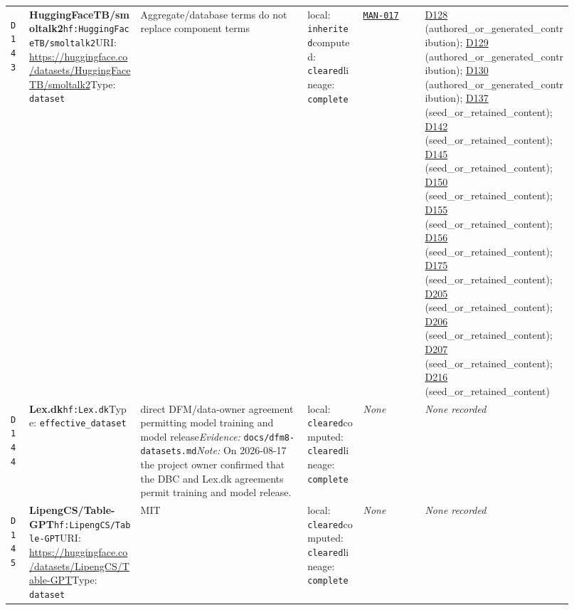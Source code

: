 \documentclass[9pt,a4paper]{article}
\newcommand{\depid}[1]{\hypertarget{dep:#1}{\texttt{#1}}}
\begin{document}
\begin{landscape}
\begin{longtable}{@{}L{0.035\linewidth}L{0.185\linewidth}L{0.27\linewidth}L{0.09\linewidth}L{0.10\linewidth}L{0.24\linewidth}@{}}
\depid{D143} & \textbf{HuggingFaceTB/smoltalk2}\newline \nolinkurl{hf:HuggingFaceTB/smoltalk2}\newline URI: \url{https://huggingface.co/datasets/HuggingFaceTB/smoltalk2}\newline Type: \texttt{dataset} & Aggregate/database terms do not replace component terms & local: \texttt{inherited}\newline computed: \texttt{cleared}\newline lineage: \texttt{complete} & \hyperlink{manual:MAN-017}{\texttt{MAN-017}} & \hyperlink{dep:D128}{D128} (authored\_or\_generated\_contribution); \hyperlink{dep:D129}{D129} (authored\_or\_generated\_contribution); \hyperlink{dep:D130}{D130} (authored\_or\_generated\_contribution); \hyperlink{dep:D137}{D137} (seed\_or\_retained\_content); \hyperlink{dep:D142}{D142} (seed\_or\_retained\_content); \hyperlink{dep:D145}{D145} (seed\_or\_retained\_content); \hyperlink{dep:D150}{D150} (seed\_or\_retained\_content); \hyperlink{dep:D155}{D155} (seed\_or\_retained\_content); \hyperlink{dep:D156}{D156} (seed\_or\_retained\_content); \hyperlink{dep:D175}{D175} (seed\_or\_retained\_content); \hyperlink{dep:D205}{D205} (seed\_or\_retained\_content); \hyperlink{dep:D206}{D206} (seed\_or\_retained\_content); \hyperlink{dep:D207}{D207} (seed\_or\_retained\_content); \hyperlink{dep:D216}{D216} (seed\_or\_retained\_content) \\
\depid{D144} & \textbf{Lex.dk}\newline \nolinkurl{hf:Lex.dk}\newline Type: \texttt{effective\_dataset} & direct DFM/data-owner agreement permitting model training and model release\newline \textit{Evidence:} \nolinkurl{docs/dfm8-datasets.md}\newline \textit{Note:} On 2026-08-17 the project owner confirmed that the DBC and Lex.dk agreements permit training and model release. & local: \texttt{cleared}\newline computed: \texttt{cleared}\newline lineage: \texttt{complete} & \textit{None} & \textit{None recorded} \\
\depid{D145} & \textbf{LipengCS/Table-GPT}\newline \nolinkurl{hf:LipengCS/Table-GPT}\newline URI: \url{https://huggingface.co/datasets/LipengCS/Table-GPT}\newline Type: \texttt{dataset} & MIT & local: \texttt{cleared}\newline computed: \texttt{cleared}\newline lineage: \texttt{complete} & \textit{None} & \textit{None recorded} \\

\end{longtable}
\end{landscape}
\end{document}
